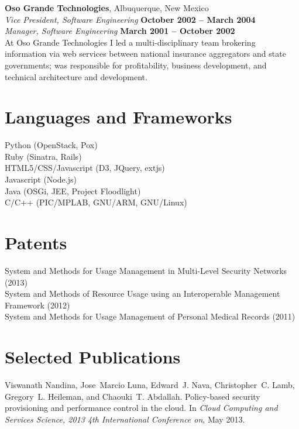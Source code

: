 \documentclass[margin,line]{resume}
\begin{document}
\begin{resume}
{\bf Oso Grande Technologies}, Albuquerque, New Mexico \vspace{2mm} \\
{\sl Vice President, Software Engineering} \hfill \textbf{October 2002 -- March 2004} \\\vspace{1mm}%
{\sl Manager, Software Engineering} \hfill \textbf{March 2001 -- October 2002} \\
At Oso Grande Technologies I led a multi-disciplinary team brokering information via web services between national insurance aggregators and state governments; was responsible for profitability, business development, and technical architecture and development.

\newpage

\section{\mysidestyle Languages and Frameworks}
Python (OpenStack, Pox) \\
Ruby (Sinatra, Rails) \\
HTML5/CSS/Javascript (D3, JQuery, extjs) \\
Javascript (Node.js) \\
Java (OSGi, JEE, Project Floodlight) \\
C/C++ (PIC/MPLAB, GNU/ARM, GNU/Linux)

\section{\mysidestyle Patents}
{\small System and Methods for Usage Management in Multi-Level Security Networks (2013)} \\
{\small System and Methods of Resource Usage using an Interoperable Management Framework (2012)} \\
{\small System and Methods for Usage Management of Personal Medical Records (2011)}

\section{\mysidestyle Selected Publications}
Viswanath Nandina, Jose~Marcio Luna, Edward~J. Nava, Christopher~C. Lamb,
  Gregory~L. Heileman, and Chaouki~T. Abdallah.
\newblock Policy-based security provisioning and performance control in the
  cloud.
\newblock In {\em Cloud Computing and Services Science, 2013 4th International
  Conference on}, May 2013.
  

\end{resume}
\end{document}
